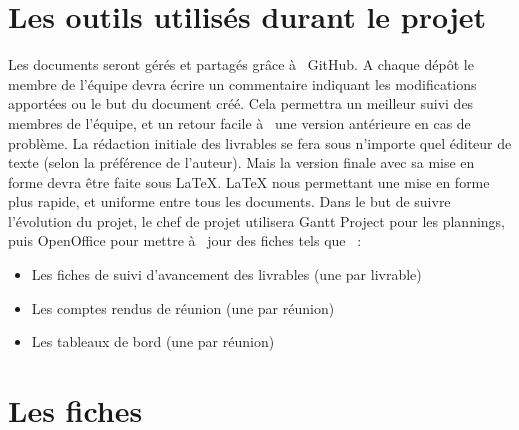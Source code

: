 \section{Les outils utilisés durant le projet}
    Les documents seront gérés et partagés grâce à  GitHub. A chaque dépôt le membre de l'équipe devra écrire un commentaire indiquant les modifications apportées ou le but du document créé. Cela permettra un meilleur suivi des membres de l'équipe, et un retour facile à  une version antérieure en cas de problème.
    La rédaction initiale des livrables se fera sous n'importe quel éditeur de texte (selon la préférence de l'auteur). Mais la version finale avec sa mise en forme devra être faite sous LaTeX. LaTeX nous permettant une mise en forme plus rapide, et uniforme entre tous les documents.
Dans le but de suivre l'évolution du projet, le chef de projet utilisera Gantt Project pour les plannings, puis OpenOffice pour mettre à  jour des fiches tels que  :
\begin{itemize}
    \item Les fiches de suivi d'avancement des livrables (une par livrable)
    \item Les comptes rendus de réunion (une par réunion)
    \item Les tableaux de bord (une par réunion)
\end{itemize}

\pagebreak
\section{Les fiches}
